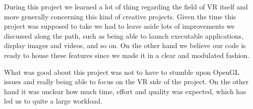\documentclass[paper=a4, fontsize=11pt]{scrartcl} %
\numberwithin{equation}{section} %
\numberwithin{figure}{section} %
\numberwithin{table}{section} %
\begin{document}
During this project we learned a lot of thing regarding the field of VR itself and more generally concerning this kind of creative projects. Given the time this project was supposed to take we had to leave aside lots of improvements we discussed along the path, such as being able to launch executable applications, display images and videos, and so on. On the other hand we believe our code is ready to house these features since we made it in a clear and modulated fashion.

What was good about this project was not to have to stumble upon OpenGL issues and really being able to focus on the VR side of the project. On the other hand it was unclear how much time, effort and quality was expected, which has led us to quite a large workload.

\end{document}
